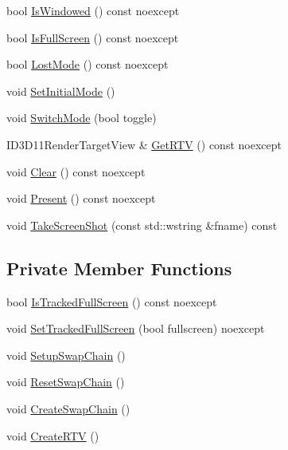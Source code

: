 \begin{DoxyCompactItemize}
\item 
bool \mbox{\hyperlink{classmage_1_1rendering_1_1_swap_chain_1_1_impl_ac7216dc943fad37a078d1a9d18eb1491}{Is\+Windowed}} () const noexcept
\item 
bool \mbox{\hyperlink{classmage_1_1rendering_1_1_swap_chain_1_1_impl_abd74163f68b0a078f970d3d54d1dcd7e}{Is\+Full\+Screen}} () const noexcept
\item 
bool \mbox{\hyperlink{classmage_1_1rendering_1_1_swap_chain_1_1_impl_ad24213091dd95a649f293fb3b3607c34}{Lost\+Mode}} () const noexcept
\item 
void \mbox{\hyperlink{classmage_1_1rendering_1_1_swap_chain_1_1_impl_a910fab71dd7977005e11179080b25f14}{Set\+Initial\+Mode}} ()
\item 
void \mbox{\hyperlink{classmage_1_1rendering_1_1_swap_chain_1_1_impl_aa3c391f6651074e73105174b68025731}{Switch\+Mode}} (bool toggle)
\item 
I\+D3\+D11\+Render\+Target\+View \& \mbox{\hyperlink{classmage_1_1rendering_1_1_swap_chain_1_1_impl_ac105ebcc013364c86cd8a7184d96df5f}{Get\+R\+TV}} () const noexcept
\item 
void \mbox{\hyperlink{classmage_1_1rendering_1_1_swap_chain_1_1_impl_ab48d24a25bd342f6a3882426e333a716}{Clear}} () const noexcept
\item 
void \mbox{\hyperlink{classmage_1_1rendering_1_1_swap_chain_1_1_impl_ae75839c2c767280d4c7e8ee009fedfe0}{Present}} () const noexcept
\item 
void \mbox{\hyperlink{classmage_1_1rendering_1_1_swap_chain_1_1_impl_a342862bf40dd80b43ee14d504c454a6e}{Take\+Screen\+Shot}} (const std\+::wstring \&fname) const
\end{DoxyCompactItemize}
\subsection*{Private Member Functions}
\begin{DoxyCompactItemize}
\item 
bool \mbox{\hyperlink{classmage_1_1rendering_1_1_swap_chain_1_1_impl_a47dd7e6a9a21395fc4d79dfda3d9cd61}{Is\+Tracked\+Full\+Screen}} () const noexcept
\item 
void \mbox{\hyperlink{classmage_1_1rendering_1_1_swap_chain_1_1_impl_a6f97179cc5e352a349ed943413d149e7}{Set\+Tracked\+Full\+Screen}} (bool fullscreen) noexcept
\item 
void \mbox{\hyperlink{classmage_1_1rendering_1_1_swap_chain_1_1_impl_a1e34fe9c72a24a0345a9ba317762863d}{Setup\+Swap\+Chain}} ()
\item 
void \mbox{\hyperlink{classmage_1_1rendering_1_1_swap_chain_1_1_impl_afbc1208702d9807bed1126caae22bda6}{Reset\+Swap\+Chain}} ()
\item 
void \mbox{\hyperlink{classmage_1_1rendering_1_1_swap_chain_1_1_impl_a990a602cf4639daa85210b4cbd1e525e}{Create\+Swap\+Chain}} ()
\item 
void \mbox{\hyperlink{classmage_1_1rendering_1_1_swap_chain_1_1_impl_a414e0c397b0c00a893b92845b6918ffc}{Create\+R\+TV}} ()
\end{DoxyCompactItemize}
